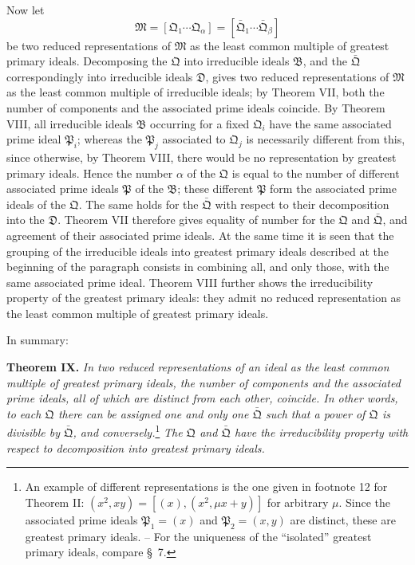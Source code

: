 \documentclass[11pt]{article}
\providecommand{\ideal}[1]{\mathfrak{#1}}
\begin{document}
Now let
\[
 \ideal M=[\ideal Q_1\cdots\ideal Q_\alpha]=[\bar{\ideal Q}_1\cdots\bar{\ideal Q}_\beta]
\]
be two reduced representations of $\ideal M$ as the least common multiple of greatest primary ideals. Decomposing the $\ideal Q$ into irreducible ideals $\ideal B$, and the $\bar{\ideal Q}$ correspondingly into irreducible ideals $\ideal D$, gives two reduced representations of $\ideal M$ as the least common multiple of irreducible ideals; by Theorem VII, both the number of components and the associated prime ideals coincide. By Theorem VIII, all irreducible ideals $\ideal B$ occurring for a fixed $\ideal Q_i$ have the same associated prime ideal $\ideal P_i$; whereas the $\ideal P_j$ associated to $\ideal Q_j$ is necessarily different from this, since otherwise, by Theorem VIII, there would be no representation by greatest primary ideals. Hence the number $\alpha$ of the $\ideal Q$ is equal to the number of different associated prime ideals $\ideal P$ of the $\ideal B$; these different $\ideal P$ form the associated prime ideals of the $\ideal Q$. The same holds for the $\bar{\ideal Q}$ with respect to their decomposition into the $\ideal D$. Theorem VII therefore gives equality of number for the $\ideal Q$ and $\bar{\ideal Q}$, and agreement of their associated prime ideals. At the same time it is seen that the grouping of the irreducible ideals into greatest primary ideals described at the beginning of the paragraph consists in combining all, and only those, with the same associated prime ideal. Theorem VIII further shows the irreducibility property of the greatest primary ideals: they admit no reduced representation as the least common multiple of greatest primary ideals.

In summary:

\textbf{Theorem IX.} \emph{In two reduced representations of an ideal as the least common multiple of greatest primary ideals, the number of components and the associated prime ideals, all of which are distinct from each other, coincide. In other words, to each $\ideal Q$ there can be assigned one and only one $\bar{\ideal Q}$ such that a power of $\ideal Q$ is divisible by $\bar{\ideal Q}$, and conversely.}\footnote{An example of different representations is the one given in footnote 12 for Theorem II: $(x^2,xy)=[(x),(x^2,\mu x+y)]$ for arbitrary $\mu$. Since the associated prime ideals $\ideal P_1=(x)$ and $\ideal P_2=(x,y)$ are distinct, these are greatest primary ideals. -- For the uniqueness of the ``isolated'' greatest primary ideals, compare \S~7.} \emph{The $\ideal Q$ and $\bar{\ideal Q}$ have the irreducibility property with respect to decomposition into greatest primary ideals.}
\end{document}
